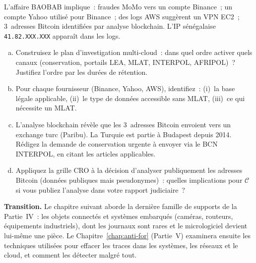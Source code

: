 \begin{boxexo}[title={\ding{45}\quad Exercice~17.3. Plan d'investigation multi-cloud \niveauexpert}]
L'affaire BAOBAB implique~: fraudes MoMo vers un compte Binance~;
un compte Yahoo utilisé pour Binance~; des logs AWS suggèrent un VPN
EC2~; 3~adresses Bitcoin identifiées par analyse blockchain.
L'IP sénégalaise \texttt{41.82.XXX.XXX} apparaît dans les logs.
\begin{enumerate}[(a)]
    \item Construisez le plan d'investigation multi-cloud~: dans quel
          ordre activer quels canaux (conservation, portails LEA, MLAT,
          INTERPOL, AFRIPOL)~? Justifiez l'ordre par les durées de
          rétention.
    \item Pour chaque fournisseur (Binance, Yahoo, AWS), identifiez~:
          (i)~la base légale applicable, (ii)~le type de données
          accessible sans MLAT, (iii)~ce qui nécessite un MLAT.
    \item L'analyse blockchain révèle que les 3~adresses Bitcoin
          envoient vers un exchange turc (Paribu). La Turquie est
          partie à Budapest depuis 2014. Rédigez la demande de
          conservation urgente à envoyer via le BCN INTERPOL, en
          citant les articles applicables.
    \item Appliquez la grille CRO à la décision d'analyser publiquement
          les adresses Bitcoin (données publiques mais pseudonymes)~:
          quelles implications pour $\mathcal{C}$ si vous publiez
          l'analyse dans votre rapport judiciaire~?
\end{enumerate}
\end{boxexo}

\bigskip

\begin{boxinfo}
\textbf{Transition.} Le chapitre suivant aborde la dernière famille
de supports de la Partie~IV~: les objets connectés et systèmes
embarqués (caméras, routeurs, équipements industriels), dont les
journaux sont rares et le micrologiciel devient lui-même une pièce.
Le Chapitre~\ref{chap:anti-for} (Partie~V) examinera ensuite les
techniques utilisées pour effacer les traces dans les systèmes,
les réseaux et le cloud, et comment les détecter malgré tout.
\end{boxinfo}
